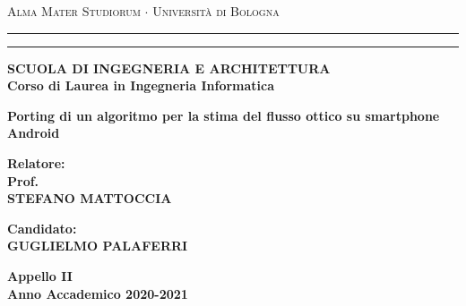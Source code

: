 

%
%



\begin{titlepage}
\begin{center}
    

{{\Large{\textsc{Alma Mater Studiorum $\cdot$ Universit\`a di
Bologna}}}} \rule[0.1cm]{15.8cm}{0.1mm}
\rule[0.5cm]{15.8cm}{0.6mm}
{\small{\bf SCUOLA DI INGEGNERIA E ARCHITETTURA\\
Corso di Laurea in Ingegneria Informatica }}
\end{center}
\vspace{35mm}
\begin{center}
{\LARGE{\bf Porting di un algoritmo per la stima del flusso ottico su smartphone Android}}\\
\end{center}
\vspace{50mm}
\par
\noindent
\begin{minipage}[t]{0.47\textwidth}
{\large{\bf Relatore:\\
Prof.\\
STEFANO MATTOCCIA}}
\end{minipage}
\hfill
\begin{minipage}[t]{0.47\textwidth}\raggedleft
{\large{\bf Candidato:\\
GUGLIELMO PALAFERRI}}
\end{minipage}
\vspace{20mm}
\begin{center}
{\large{\bf Appello II\\%
Anno Accademico 2020-2021}}%
\end{center}
\end{titlepage}

%
